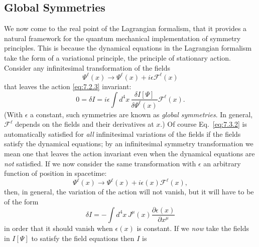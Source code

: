 
\subsection{Global Symmetries}

We now come to the real point of the Lagrangian formalism, that it provides a
natural framework for the quantum mechanical implementation of symmetry
principles. This is because the dynamical equations in the Lagrangian formalism
take the form of a variational principle, the principle of stationary action.
Consider any infinitesimal transformation of the fields
\begin{equation}
\Psi^\ell(x)\longrightarrow\Psi^\ell(x)+i\epsilon\mathcal{F}^\ell(x)
\tag{7.3.1}\label{eq:7.3.1}
\end{equation}
that leaves the action \eqref{eq:7.2.3} invariant:
\begin{equation}
0=\delta I=i\epsilon\int d^4x\,
\frac{\delta I[\Psi]}{\delta\Psi^\ell(x)}\mathcal{F}^\ell(x).
\tag{7.3.2}\label{eq:7.3.2}
\end{equation}
(With $\epsilon$ a constant, such symmetries are known as \emph{global
symmetries}. In general, $\mathcal{F}^\ell$ depends on the fields and their
derivatives at $x$.) Of course Eq.~\eqref{eq:7.3.2} is automatically satisfied for
\emph{all} infinitesimal variations of the fields if the fields satisfy the
dynamical equations; by an infinitesimal symmetry transformation we mean one
that leaves the action invariant even when the dynamical equations are
\emph{not} satisfied. If we now consider the same transformation with
$\epsilon$ an arbitrary function of position in spacetime:
\begin{equation}
\Psi^\ell(x)\longrightarrow\Psi^\ell(x)
+i\epsilon(x)\mathcal{F}^\ell(x),
\tag{7.3.3}\label{eq:7.3.3}
\end{equation}
then, in general, the variation of the action will not vanish, but it will
have to be of the form
\begin{equation}
\delta I=-\int d^4x\,J^\mu(x)\frac{\partial\epsilon(x)}{\partial x^\mu}
\tag{7.3.4}\label{eq:7.3.4}
\end{equation}
in order that it should vanish when $\epsilon(x)$ is constant. If we \emph{now}
take the fields in $I[\Psi]$ to satisfy the field equations then $I$ is
